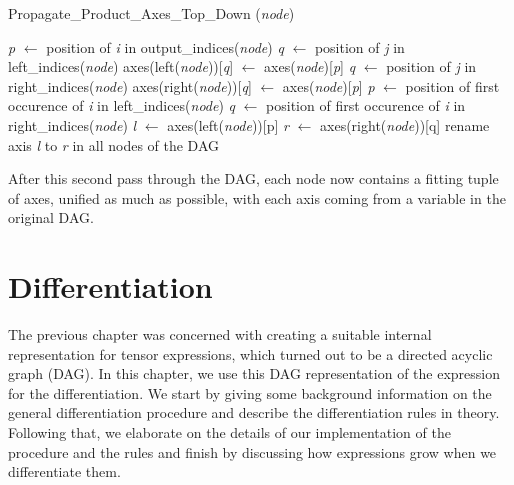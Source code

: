 \documentclass[12pt, a4paper]{report}
\begin{document}
\begin{algorithm}[ht!] %
    \caption{Propagate\_Product\_Axes\_Top\_Down (\textit{node})}
    \label{alg:product_axes_2}
    \begin{algorithmic}
            \State \textit{p} $\gets$ position of \textit{i} in output\_indices(\textit{node})
                \State \textit{q} $\gets$ position of \textit{j} in left\_indices(\textit{node})
                    \State axes(left(\textit{node}))[\textit{q}] $\gets$ axes(\textit{node})[\textit{p}]
                \EndIf
            \EndFor
                \State \textit{q} $\gets$ position of \textit{j} in right\_indices(\textit{node})
                    \State axes(right(\textit{node}))[\textit{q}] $\gets$ axes(\textit{node})[\textit{p}]
                \EndIf
            \EndFor
        \EndFor
         
            \State \textit{p} $\gets$ position of first occurence of \textit{i} in left\_indices(\textit{node})
                \State \textit{q} $\gets$ position of first occurence of \textit{i} in right\_indices(\textit{node})
                \State \textit{l} $\gets$ axes(left(\textit{node}))[p]
                \State \textit{r} $\gets$ axes(right(\textit{node}))[q]
                \State rename axis \textit{l} to \textit{r} in all nodes of the DAG
            \EndIf
        \EndFor
    \end{algorithmic}
\end{algorithm}

After this second pass through the DAG, each node now contains a fitting tuple of axes, unified as much as possible, with each axis coming from a variable in the original DAG.

\FloatBarrier
\chapter{Differentiation}
The previous chapter was concerned with creating a suitable internal representation for tensor expressions, which turned out to be a directed acyclic graph (DAG).
In this chapter, we use this DAG representation of the expression for the differentiation.
We start by giving some background information on the general differentiation procedure and describe the differentiation rules in theory.
Following that, we elaborate on the details of our implementation of the procedure and the rules and finish by discussing how expressions grow when we differentiate them.
\end{document}
